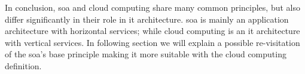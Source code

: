 In conclusion, \ac{soa} and cloud computing share many common principles, but also differ significantly in
their role in \acs{it} architecture. \ac{soa} is mainly an application architecture with horizontal services;
while cloud computing is an \acs{it} architecture with vertical services. In following section we will explain
a possible re-visitation of the \ac{soa}'s base principle making it more suitable with the cloud computing
definition.